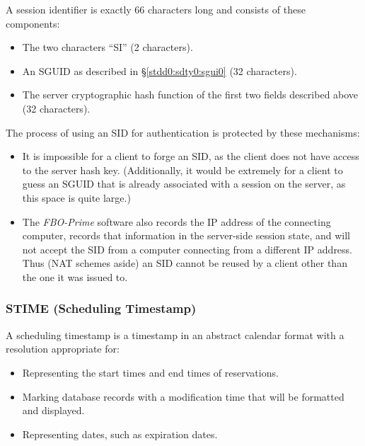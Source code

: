 \documentclass[letterpaper,10pt,titlepage]{article}
\newcommand{\productbasename}{FBO-Prime}
\begin{document}
A session identifier is exactly 66 characters long and consists of these components:

\begin{itemize}
\item The two characters ``SI'' (2 characters).
\item An SGUID as described in \S{}\ref{stdd0:sdty0:sgui0} (32 characters).
\item The server cryptographic hash function of the first two fields described
      above (32 characters).
\end{itemize}

The process of using an SID for authentication is protected by these mechanisms:

\begin{itemize}
\item It is impossible for a client to forge an SID, as the client does not have
      access to the server hash key.  (Additionally, it would be extremely for
      a client to guess an SGUID that is already associated with a session on the
      server, as this space is quite large.)
\item The \emph{\productbasename{}} software also records the IP address of the 
      connecting computer, records that information in the server-side session
      state, and will not accept the SID from a computer connecting from a different
      IP address.  Thus (NAT schemes aside) an SID cannot be reused by a client
      other than the one it was issued to.
\end{itemize}



\subsubsection{STIME (Scheduling Timestamp)}
\label{stdd0:sdty0:stim0}

%
A scheduling timestamp is a timestamp in an abstract
calendar format with a resolution appropriate for:

\begin{itemize}
\item Representing the start times and end times of
      reservations.
\item Marking database records with a modification time that will be
      formatted and displayed.
\item Representing dates, such as expiration dates.
\end{itemize}
\end{document}
